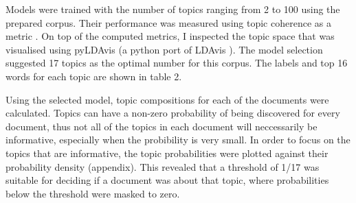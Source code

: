 Models were trained with the number of topics ranging from 2 to 100 using the prepared corpus. Their performance was measured using topic coherence as a metric \parencite{roder2015exploring}. On top of the computed metrics, I inspected the topic space that was visualised using pyLDAvis (a python port of LDAvis \parencite{sievert2014ldavis}). The model selection suggested 17 topics as the optimal number for this corpus. The labels and top 16 words for each topic are shown in table 2.

Using the selected model, topic compositions for each of the documents were calculated. Topics can have a non-zero probability of being discovered for every document, thus not all of the topics in each document will neccessarily be informative, especially when the probibility is very small. In order to focus on the topics that are informative, the topic probabilities were plotted against their probability density (appendix). This revealed that a threshold of 1/17 was suitable for deciding if a document was about that topic, where probabilities below the threshold were masked to zero.